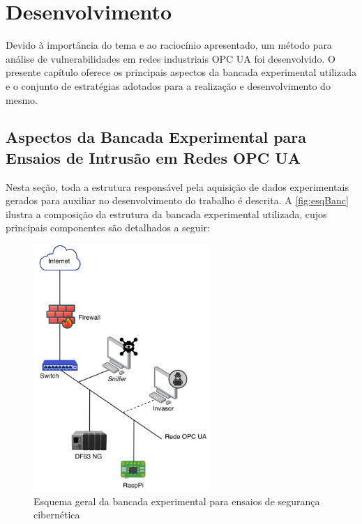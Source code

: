 \chapter{Desenvolvimento} \label{cap:desenvolvimento}

Devido à importância do tema e ao raciocínio apresentado, um método para análise de vulnerabilidades em redes industriais OPC UA foi desenvolvido. O presente capítulo oferece os principais aspectos da bancada experimental utilizada e o conjunto de estratégias adotados para a realização e desenvolvimento do mesmo.

\section{Aspectos da Bancada Experimental para Ensaios de Intrusão em Redes OPC UA}

    Nesta seção, toda a estrutura responsável pela aquisição de dados experimentais gerados para auxiliar no desenvolvimento do trabalho é descrita. A \autoref{fig:esqBanc} ilustra a composição da estrutura da bancada experimental utilizada, cujos principais componentes são detalhados a seguir:

    \begin{figure}[htbp]
        \caption{\label{fig:esqBanc}Esquema geral da bancada experimental para ensaios de segurança cibernética}
        \begin{center}
            \includegraphics[width=0.6\textwidth]{USPSC-img/bancada.png}
        \end{center}
    \end{figure}

